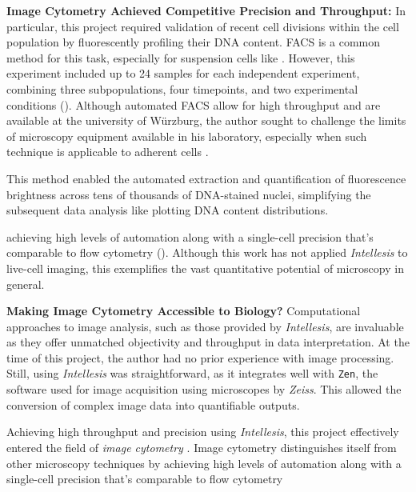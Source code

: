 \textbf{Image Cytometry Achieved Competitive Precision and Throughput:}
In particular, this project required validation of recent cell divisions within
the \nMAina cell population by fluorescently profiling their DNA content.
\ac{FACS} is a common method for this task, especially for suspension cells like
\INA \cite{darzynkiewiczDNAContentMeasurement1997}. However, this experiment
included up to 24 samples for each independent experiment, combining three
subpopulations, four timepoints, and two experimental conditions
(). Although automated \ac{FACS} allow for high
throughput and are available at the university of Würzburg, the author sought to
challenge the limits of microscopy equipment available in his laboratory,
especially when such technique is applicable to adherent cells
\cite{roukosCellCycleStaging2015}.

This method enabled the automated extraction and quantification of
fluorescence brightness across tens of thousands of DNA-stained nuclei,
simplifying the subsequent data analysis like plotting DNA content
distributions.

achieving
high levels of automation along with a single-cell precision that's comparable
to flow cytometry (). Although this work has not
applied \textit{Intellesis} to live-cell imaging, this exemplifies the vast
quantitative potential of microscopy 
in general.


\textbf{Making Image Cytometry Accessible to Biology?}
Computational approaches to image analysis, such as those provided by
\textit{Intellesis}, are invaluable as they offer unmatched objectivity and
throughput in data interpretation. At the time of this project, the author had
no prior experience with image processing. Still, using \textit{Intellesis} was
straightforward, as it integrates well with \texttt{Zen}, the software used for
image acquisition using microscopes by \textit{Zeiss}. This allowed the
conversion of complex image data into quantifiable outputs.

Achieving high throughput and precision using \textit{Intellesis}, this project
effectively entered the field of \emph{image cytometry}
\cite{guptaDeepLearningImage2019}. Image cytometry distinguishes itself from
other microscopy techniques by achieving high levels of automation along with a
single-cell precision that's comparable to flow cytometry




